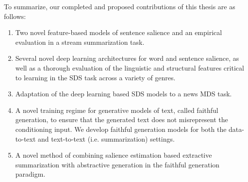 To summarize, our completed and proposed contributions of this thesis are as 
follows:
\begin{enumerate}

 \item Two novel feature-based models of sentence salience and an empirical
    evaluation in a stream summarization task.


 \item Several novel deep learning architectures for word and sentence 
   salience, as well as a thorough evaluation of the linguistic and
   structural features critical to learning in the SDS task across a 
   variety of genres.

 \item Adaptation of the deep learning based SDS models to a news MDS task. 

 \item A novel training regime for generative models of text, 
     called faithful generation, to ensure that the generated text does
     not misrepresent the conditioning input. We develop faithful generation
     models for both the data-to-text and text-to-text (i.e. summarization)
     settings.

 \item A novel method of combining salience estimation based extractive 
     summarization with abstractive generation in the faithful generation
    paradigm.    




\end{enumerate}




